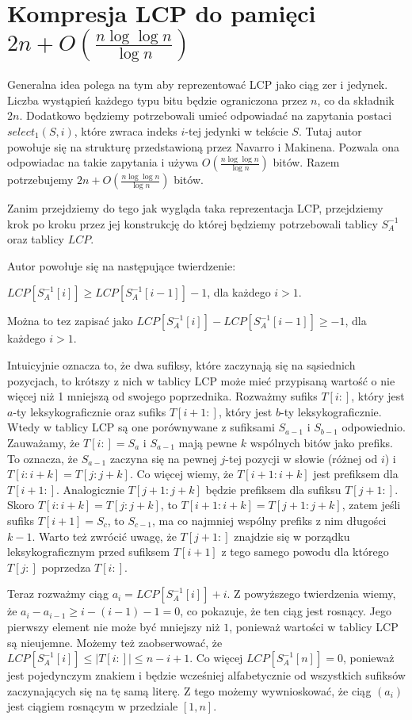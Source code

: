 \documentclass{article}
\begin{document}
\section{Kompresja LCP do pamięci $2n + O(\frac{n \log\log{n}}{\log{n}})$}

Generalna idea polega na tym aby reprezentować LCP jako ciąg zer i jedynek. Liczba wystąpień każdego typu bitu będzie ograniczona przez $n$, co da składnik $2n$. Dodatkowo będziemy potrzebowali umieć odpowiadać na zapytania postaci $select_1(S, i)$, które zwraca indeks $i$-tej jedynki w tekście $S$. Tutaj autor powołuje się na strukturę przedstawioną przez Navarro i M\:akinena. Pozwala ona odpowiadac na takie zapytania i używa $O(\frac{n \log\log{n}}{\log{n}})$ bitów. Razem potrzebujemy $2n +  O(\frac{n \log\log{n}}{\log{n}})$ bitów.

Zanim przejdziemy do tego jak wygląda taka reprezentacja LCP, przejdziemy krok po kroku przez jej konstrukcję do której będziemy potrzebowali tablicy $S_A^{-1}$ oraz tablicy $LCP$. 

Autor powołuje się na następujące twierdzenie:

$LCP[S_A^{-1}[i]] \ge LCP[S_A^{-1}[i - 1]] - 1$, dla każdego $ i > 1$.

Można to tez zapisać jako $LCP[S_A^{-1}[i]] - LCP[S_A^{-1}[i - 1]] \ge - 1$, dla każdego $ i > 1$.

Intuicyjnie oznacza to, że dwa sufiksy, które zaczynają się na sąsiednich pozycjach, to krótszy z nich w tablicy LCP może mieć przypisaną wartość o nie więcej niż 1 mniejszą od swojego poprzednika. Rozważmy sufiks $T[i:]$, który jest $a$-ty leksykograficznie oraz sufiks $T[i+1:]$, który jest $b$-ty leksykograficznie. Wtedy w tablicy LCP są one porównywane z sufiksami $S_{a-1}$ i $S_{b-1}$ odpowiednio. Zauważamy, że $T[i:] = S_a$ i $S_{a-1}$ mają pewne $k$ wspólnych bitów jako prefiks. To oznacza, że $S_{a-1}$ zaczyna się na pewnej $j$-tej pozycji w słowie (różnej od $i$) i $T[i:i+k] = T[j:j+k]$. Co więcej wiemy, że $T[i+1:i+k]$ jest prefiksem dla $T[i+1:]$. Analogicznie $T[j+1:j+k]$ będzie prefiksem dla sufiksu $T[j+1:]$. Skoro $T[i:i+k] = T[j:j+k]$, to $T[i+1:i+k] = T[j+1: j+k]$, zatem jeśli sufiks $T[i+1] = S_c$, to $S_{c-1}$, ma co najmniej wspólny prefiks z nim długości $k-1$. Warto też zwrócić uwagę, że $T[j+1:]$ znajdzie się w porządku leksykograficznym przed sufiksem $T[i+1]$ z tego samego powodu dla którego $T[j:]$ poprzedza $T[i:]$.

Teraz rozważmy ciąg $a_i = LCP[S_A^{-1}[i]] + i$. Z powyższego twierdzenia wiemy, że $a_i - a_{i-1} \ge i - (i-1) - 1 = 0$, co pokazuje, że ten ciąg jest rosnący. Jego pierwszy element nie może być mniejszy niż $1$, ponieważ wartości w tablicy LCP są nieujemne. Możemy też zaobserwować, że $LCP[S_A^{-1}[i]] \le |T[i:]| \le n-i+1$. Co więcej $LCP[S_A^{-1}[n]] = 0$, ponieważ jest pojedynczym znakiem i będzie wcześniej alfabetycznie od wszystkich sufiksów zaczynających się na tę samą literę. Z tego możemy wywnioskować, że ciąg $(a_i)$ jest ciągiem rosnącym w przedziale $[1,n]$.
\end{document}
